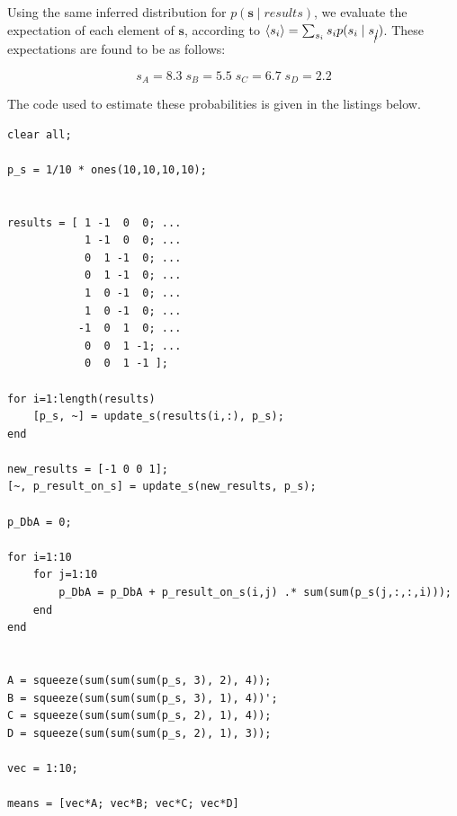 \documentclass[11pt,a4paper,oneside]{report}
\begin{document}
Using the same inferred distribution for $p(\mathbf{s} \; | \; results)$, we
evaluate the expectation of each element of $\mathbf{s}$, according to
$\langle s_i \rangle = \sum_{s_i} s_i p(s_i \; | \; s_{\cancel{i}})$.
These expectations are found to be as follows:

\begin{equation}
s_A  = 8.3 \; s_B = 5.5 \; s_C = 6.7 \; s_D = 2.2
\end{equation}

The code used to estimate these probabilities is given in the listings below.

\begin{lstlisting}
clear all;

p_s = 1/10 * ones(10,10,10,10);


results = [ 1 -1  0  0; ...
            1 -1  0  0; ...
            0  1 -1  0; ...
            0  1 -1  0; ...
            1  0 -1  0; ...
            1  0 -1  0; ...
           -1  0  1  0; ...
            0  0  1 -1; ...
            0  0  1 -1 ];
        
for i=1:length(results)
    [p_s, ~] = update_s(results(i,:), p_s);
end

new_results = [-1 0 0 1];
[~, p_result_on_s] = update_s(new_results, p_s);

p_DbA = 0;

for i=1:10
    for j=1:10
        p_DbA = p_DbA + p_result_on_s(i,j) .* sum(sum(p_s(j,:,:,i)));
    end
end


A = squeeze(sum(sum(sum(p_s, 3), 2), 4));
B = squeeze(sum(sum(sum(p_s, 3), 1), 4))';
C = squeeze(sum(sum(sum(p_s, 2), 1), 4));
D = squeeze(sum(sum(sum(p_s, 2), 1), 3));

vec = 1:10;

means = [vec*A; vec*B; vec*C; vec*D]
\end{lstlisting}
\end{document}
